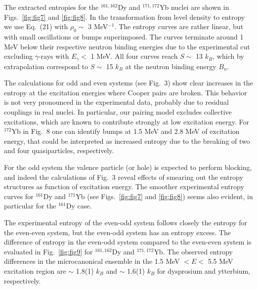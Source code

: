 The extracted entropies for the $^{161,162}$Dy and $^{171,172}$Yb nuclei are shown in Figs.\ \ref{fig:fig7} and \ref{fig:fig8}. In the transformation from level density to entropy we use Eq.~(21) with $\rho_0 \sim$ 3 MeV$^{-1}$. The entropy curves are rather linear, but with small oscillations or bumps superimposed. The curves terminate around 1 MeV below their respective neutron binding energies due to the experimental cut excluding $\gamma$-rays with $E_{\gamma} <$ 1 MeV. All four curves reach $S \sim$ 13 $k_B$, which by extrapolation correspond to $S \sim$ 15 $k_B$ at the neutron binding energy $B_n$. 

The calculations for odd and even systems (see Fig.~3) show clear increases in the entropy at the excitation energies where Cooper pairs are broken. This behavior is not very pronounced in the experimental data, probably due to residual couplings in real nuclei. In particular, our pairing model excludes collective excitations, which are known to contribute strongly at low excitation energy. For $^{172}$Yb in Fig.~8 one can identify bumps at 1.5 MeV and 2.8 MeV of excitation energy, that could be interpreted as increased entropy due to the breaking of two and four quasiparticles, respectively. 

For the odd system the valence particle (or hole) is expected to perform blocking, and indeed the calculations of Fig.~3 reveal effects of smearing out the entropy structures as function of excitation energy. The smoother experimental entropy curves for $^{161}$Dy and $^{171}$Yb (see Figs.\ \ref{fig:fig7} and \ref{fig:fig8}) seems also evident, in particular for the $^{161}$Dy case. 

The experimental entropy of the even-odd system follows closely the entropy for the even-even system, but the even-odd system has an entropy excess. 
The difference of entropy in the even-odd system compared to the even-even system is evaluated in Fig.\ \ref{fig:fig9} for $^{161,162}$Dy and $^{171,172}$Yb. The observed entropy differences in the microcanonical ensemble 
 in the 1.5 MeV $ < E < $ 5.5 MeV excitation region are $\sim$ 1.8(1) $k_B$ and $\sim$ 1.6(1) $k_B$ for dysprosium and ytterbium, respectively. 

